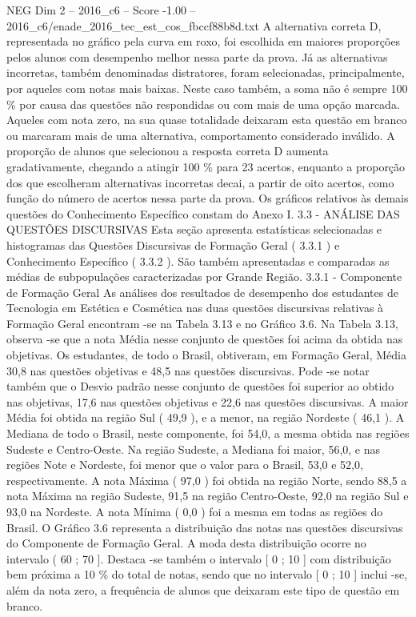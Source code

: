 \begin{textsample}{NEG Dim 2 – 2016\_c6 – Score -1.00 – 2016\_c6/enade\_2016\_tec\_est\_cos\_fbccf88b8d.txt}
A alternativa correta D, representada no gráfico pela curva em roxo, foi escolhida em maiores proporções pelos alunos com desempenho melhor nessa parte da prova.
Já as alternativas incorretas, também denominadas distratores, foram selecionadas, principalmente, por aqueles com notas mais baixas.
Neste caso também, a soma não é sempre 100 \% por causa das questões não respondidas ou com mais de uma opção marcada.
Aqueles com nota zero, na sua quase totalidade deixaram esta questão em branco ou marcaram mais de uma alternativa, comportamento considerado inválido.
A proporção de alunos que selecionou a resposta correta D aumenta gradativamente, chegando a atingir 100 \% para 23 acertos, enquanto a proporção dos que escolheram alternativas incorretas decai, a partir de oito acertos, como função do número de acertos nessa parte da prova.
Os gráficos relativos às demais questões do Conhecimento Específico constam do Anexo I. 3.3 - ANÁLISE DAS QUESTÕES DISCURSIVAS Esta seção apresenta estatísticas selecionadas e histogramas das Questões Discursivas de Formação Geral ( 3.3.1 ) e Conhecimento Específico ( 3.3.2 ).
São também apresentadas e comparadas as médias de subpopulações caracterizadas por Grande Região. 3.3.1 - Componente de Formação Geral As análises dos resultados de desempenho dos estudantes de Tecnologia em Estética e Cosmética nas duas questões discursivas relativas à Formação Geral encontram -se na Tabela 3.13 e no Gráfico 3.6.
Na Tabela 3.13, observa -se que a nota Média nesse conjunto de questões foi acima da obtida nas objetivas.
Os estudantes, de todo o Brasil, obtiveram, em Formação Geral, Média 30,8 nas questões objetivas e 48,5 nas questões discursivas.
Pode -se notar também que o Desvio padrão nesse conjunto de questões foi superior ao obtido nas objetivas, 17,6 nas questões objetivas e 22,6 nas questões discursivas.
A maior Média foi obtida na região Sul ( 49,9 ), e a menor, na região Nordeste ( 46,1 ).
A Mediana de todo o Brasil, neste componente, foi 54,0, a mesma obtida nas regiões Sudeste e Centro-Oeste.
Na região Sudeste, a Mediana foi maior, 56,0, e nas regiões Note e Nordeste, foi menor que o valor para o Brasil, 53,0 e 52,0, respectivamente.
A nota Máxima ( 97,0 ) foi obtida na região Norte, sendo 88,5 a nota Máxima na região Sudeste, 91,5 na região Centro-Oeste, 92,0 na região Sul e 93,0 na Nordeste.
A nota Mínima ( 0,0 ) foi a mesma em todas as regiões do Brasil.
O Gráfico 3.6 representa a distribuição das notas nas questões discursivas do Componente de Formação Geral.
A moda desta distribuição ocorre no intervalo ( 60 ; 70 ].
Destaca -se também o intervalo [ 0 ; 10 ] com distribuição bem próxima a 10 \% do total de notas, sendo que no intervalo [ 0 ; 10 ] inclui -se, além da nota zero, a frequência de alunos que deixaram este tipo de questão em branco.

\end{textsample}
